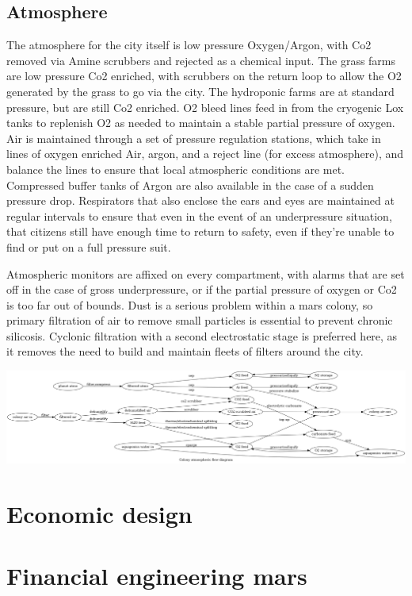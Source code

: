 \documentclass[10pt]{article}
\begin{document}
\subsection*{Atmosphere}
The atmosphere for the city itself is low pressure Oxygen/Argon, with Co2 removed via Amine scrubbers and rejected as a chemical input. The grass farms are low pressure Co2 enriched, with scrubbers on the return loop to allow the O2 generated by the grass to go via the city. The hydroponic farms are at standard pressure, but are still Co2 enriched. O2 bleed lines feed in from the cryogenic Lox tanks to replenish O2 as needed to maintain a stable partial pressure of oxygen. Air is maintained through a set of pressure regulation stations, which take in lines of oxygen enriched Air, argon, and a reject line (for excess atmosphere), and balance the lines to ensure that local atmospheric conditions are met. Compressed buffer tanks of Argon are also available in the case of a sudden pressure drop. Respirators that also enclose the ears and eyes are maintained at regular intervals to ensure that even in the event of an underpressure situation, that citizens still have enough time to return to safety, even if they're unable to find or put on a full pressure suit.

Atmospheric monitors are affixed on every compartment, with alarms that are set off in the case of gross underpressure, or if the partial pressure of oxygen or Co2 is too far out of bounds. Dust is a serious problem within a mars colony, so primary filtration of air to remove small particles is essential to prevent chronic silicosis. Cyclonic filtration with a second electrostatic stage is preferred here, as it removes the need to build and maintain fleets of filters around the city. 

\includegraphics[width=1\textwidth]{fig_atmo.png}


\section*{Economic design}

\section{Financial engineering mars}
\end{document}
